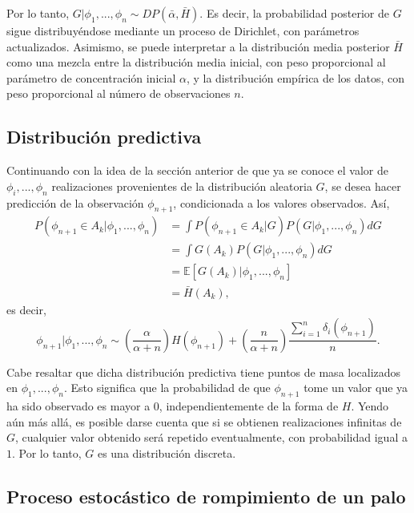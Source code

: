 Por lo tanto, $G|\phi_1,...,\phi_n \sim DP(\bar{\alpha},\bar{H})$. Es decir, la probabilidad posterior de $G$ sigue distribuy\'endose mediante un proceso de Dirichlet, con par\'ametros actualizados. Asimismo, se puede interpretar a la distribuci\'on media posterior $\bar{H}$ como una mezcla entre la distribuci\'on media inicial, con peso proporcional al par\'ametro de concentraci\'on inicial $\alpha$, y la distribuci\'on emp\'irica de los datos, con peso proporcional al n\'umero de observaciones $n$. 

\subsection{Distribuci\'on predictiva}

Continuando con la idea de la secci\'on anterior de que ya se conoce el valor de $\phi_i,...,\phi_n$ realizaciones provenientes de la distribuci\'on aleatoria $G$, se desea hacer predicci\'on de la observaci\'on $\phi_{n+1}$, condicionada a los valores observados. As\'i,
\begin{equation*}
\begin{aligned}
   P(\phi_{n+1} \in A_k|\phi_1,...,\phi_n)
   &= \int P(\phi_{n+1} \in A_k|G) P(G|\phi_1,...,\phi_n) dG \\ 
   &= \int G(A_k) P(G|\phi_1,...,\phi_n) dG \\ 
   &= \mathbb{E}[G(A_k)|\phi_1,...,\phi_n] \\
   &= \bar{H}(A_k),
\end{aligned}    
\end{equation*}
es decir, 
\begin{equation*}
    \phi_{n+1}|\phi_1,...,\phi_n \sim 
    \left(\frac{\alpha}{\alpha + n}\right)H(\phi_{n+1}) + 
    \left(\frac{n}{\alpha + n}\right)\frac{\sum_{i=1}^n \delta_i(\phi_{n+1})}{n}.
\end{equation*}

Cabe resaltar que dicha distribuci\'on predictiva tiene puntos de masa localizados en $\phi_1,...,\phi_n$. Esto significa que la probabilidad de que $\phi_{n+1}$ tome un valor que ya ha sido observado es mayor a $0$, independientemente de la forma de $H$. Yendo a\'un m\'as all\'a, es posible darse cuenta que si se obtienen realizaciones infinitas de $G$, cualquier valor obtenido ser\'a repetido eventualmente, con probabilidad igual a $1$. Por lo tanto, $G$ es una distribuci\'on discreta.

\subsection{Proceso estoc\'astico de rompimiento de un palo}

